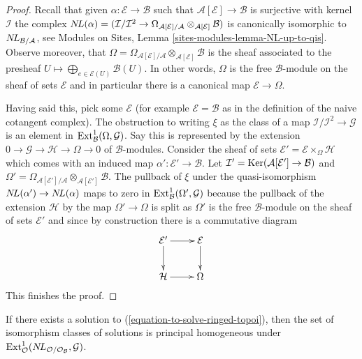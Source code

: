 \begin{proof}
Recall that given $\alpha : \mathcal{E} \to \mathcal{B}$
such that $\mathcal{A}[\mathcal{E}] \to \mathcal{B}$ is surjective
with kernel $\mathcal{I}$ the complex
$\mathop{N\!L}\nolimits(\alpha) = (\mathcal{I}/\mathcal{I}^2 \to 
\Omega_{\mathcal{A}[\mathcal{E}]/\mathcal{A}}
\otimes_{\mathcal{A}[\mathcal{E}]} \mathcal{B})$ is canonically
isomorphic to $\mathop{N\!L}\nolimits_{\mathcal{B}/\mathcal{A}}$, see
Modules on Sites, Lemma \ref{sites-modules-lemma-NL-up-to-qis}.
Observe moreover, that
$\Omega = \Omega_{\mathcal{A}[\mathcal{E}]/\mathcal{A}}
\otimes_{\mathcal{A}[\mathcal{E}]} \mathcal{B}$ is the sheaf
associated to the presheaf
$U \mapsto \bigoplus_{e \in \mathcal{E}(U)} \mathcal{B}(U)$.
In other words, $\Omega$ is the free $\mathcal{B}$-module on the
sheaf of sets $\mathcal{E}$ and in particular there is a canonical
map $\mathcal{E} \to \Omega$.

\medskip\noindent
Having said this, pick some $\mathcal{E}$ (for example
$\mathcal{E} = \mathcal{B}$ as in the definition of the naive cotangent
complex). The obstruction to writing $\xi$ as the class of a map
$\mathcal{I}/\mathcal{I}^2 \to \mathcal{G}$ is an element in
$\mathop{\mathrm{Ext}}\nolimits^1_\mathcal{B}(\Omega, \mathcal{G})$. Say this is represented
by the extension $0 \to \mathcal{G} \to \mathcal{H} \to \Omega \to 0$
of $\mathcal{B}$-modules. Consider the sheaf of sets
$\mathcal{E}' = \mathcal{E} \times_\Omega \mathcal{H}$
which comes with an induced map $\alpha' : \mathcal{E}' \to \mathcal{B}$.
Let $\mathcal{I}' = \mathop{\mathrm{Ker}}(\mathcal{A}[\mathcal{E}'] \to \mathcal{B})$
and $\Omega' = \Omega_{\mathcal{A}[\mathcal{E}']/\mathcal{A}}
\otimes_{\mathcal{A}[\mathcal{E}']} \mathcal{B}$.
The pullback of $\xi$ under the quasi-isomorphism
$\mathop{N\!L}\nolimits(\alpha') \to \mathop{N\!L}\nolimits(\alpha)$ maps to zero in
$\mathop{\mathrm{Ext}}\nolimits^1_\mathcal{B}(\Omega', \mathcal{G})$
because the pullback of the extension $\mathcal{H}$
by the map $\Omega' \to \Omega$ is split as $\Omega'$ is the free
$\mathcal{B}$-module on the sheaf of sets $\mathcal{E}'$ and since
by construction there is a commutative diagram
$$
\xymatrix{
\mathcal{E}' \ar[r] \ar[d] & \mathcal{E} \ar[d] \\
\mathcal{H} \ar[r] & \Omega
}
$$
This finishes the proof.
\end{proof}

\begin{lemma}
\label{lemma-choices-ringed-topoi}
If there exists a solution to (\ref{equation-to-solve-ringed-topoi}),
then the set of isomorphism classes of solutions is principal homogeneous
under $\mathop{\mathrm{Ext}}\nolimits^1_\mathcal{O}(
\mathop{N\!L}\nolimits_{\mathcal{O}/\mathcal{O}_\mathcal{B}}, \mathcal{G})$.
\end{lemma}

